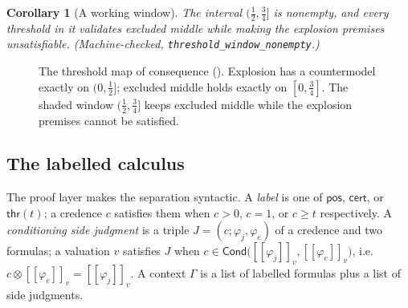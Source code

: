 \documentclass[11pt,a4paper]{article}
\newtheorem{corollary}[theorem]{Corollary}
\newcommand{\conjc}{\otimes}
\newcommand{\Cond}{\mathsf{Cond}}
\newcommand{\evalc}[2]{[\![ {#2} ]\!]_{#1}}
\begin{document}
\begin{corollary}[A working window]
\label{cor:window}
The interval $(\tfrac12, \tfrac34]$ is nonempty, and every threshold in
it validates excluded middle while making the explosion premises
unsatisfiable.
(Machine-checked, \texttt{threshold\_window\_nonempty}.)
\end{corollary}

\begin{figure}[ht]
\centering
{}
\caption{The threshold map of consequence
().
Explosion has a countermodel exactly on $(0,\tfrac12]$; excluded
middle holds exactly on $[0,\tfrac34]$.
The shaded window $(\tfrac12,\tfrac34]$ keeps excluded middle while
the explosion premises cannot be satisfied.}
\label{fig:threshold}
\end{figure}

\subsection{The labelled calculus}

The proof layer makes the separation syntactic.
A \emph{label} is one of $\mathsf{pos}$, $\mathsf{cert}$, or
$\mathsf{thr}(t)$; a credence $c$ satisfies them when $c > 0$,
$c = 1$, or $c \geq t$ respectively.
A \emph{conditioning side judgment} is a triple
$J = (c; \varphi_j, \varphi_e)$ of a credence and two formulas; a
valuation $v$ satisfies $J$ when
$c \in \Cond\bigl(\evalc{v}{\varphi_j}, \evalc{v}{\varphi_e}\bigr)$,
i.e.\ $c \conjc \evalc{v}{\varphi_e} = \evalc{v}{\varphi_j}$.
A context $\Gamma$ is a list of labelled formulas plus a list of side
judgments.
\end{document}

